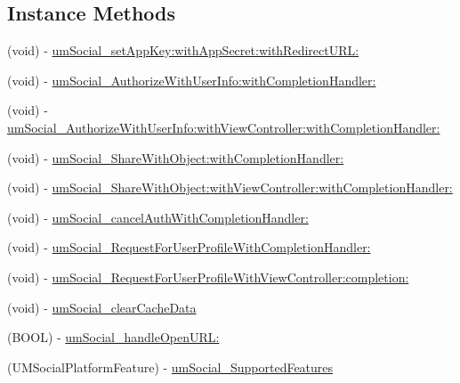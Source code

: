 \subsection*{Instance Methods}
\begin{DoxyCompactItemize}
\item 
(void) -\/ \mbox{\hyperlink{protocol_u_m_social_platform_provider_01-p_a4591a33b9f6de5ff2a688fbb82e42d6b}{um\+Social\+\_\+set\+App\+Key\+:with\+App\+Secret\+:with\+Redirect\+U\+R\+L\+:}}
\item 
(void) -\/ \mbox{\hyperlink{protocol_u_m_social_platform_provider_01-p_ae1ebabde25fa467a8dbd3360c69f1cae}{um\+Social\+\_\+\+Authorize\+With\+User\+Info\+:with\+Completion\+Handler\+:}}
\item 
(void) -\/ \mbox{\hyperlink{protocol_u_m_social_platform_provider_01-p_a99c9538562ad13c437698eadbd8fe7c6}{um\+Social\+\_\+\+Authorize\+With\+User\+Info\+:with\+View\+Controller\+:with\+Completion\+Handler\+:}}
\item 
(void) -\/ \mbox{\hyperlink{protocol_u_m_social_platform_provider_01-p_a23c57a8e07c351874d8b2bff217c3fd7}{um\+Social\+\_\+\+Share\+With\+Object\+:with\+Completion\+Handler\+:}}
\item 
(void) -\/ \mbox{\hyperlink{protocol_u_m_social_platform_provider_01-p_aaee3cd0e221b820d92575edbbf198c52}{um\+Social\+\_\+\+Share\+With\+Object\+:with\+View\+Controller\+:with\+Completion\+Handler\+:}}
\item 
(void) -\/ \mbox{\hyperlink{protocol_u_m_social_platform_provider_01-p_acd16d08a46fd30b401adca83262cc586}{um\+Social\+\_\+cancel\+Auth\+With\+Completion\+Handler\+:}}
\item 
(void) -\/ \mbox{\hyperlink{protocol_u_m_social_platform_provider_01-p_a1d888890a07689a660523c8e9cb614d9}{um\+Social\+\_\+\+Request\+For\+User\+Profile\+With\+Completion\+Handler\+:}}
\item 
(void) -\/ \mbox{\hyperlink{protocol_u_m_social_platform_provider_01-p_a19f829db2b2d3c83f332556b3685e411}{um\+Social\+\_\+\+Request\+For\+User\+Profile\+With\+View\+Controller\+:completion\+:}}
\item 
(void) -\/ \mbox{\hyperlink{protocol_u_m_social_platform_provider_01-p_a0ed5acc40aa41283f7e5fb5a1ef7faa8}{um\+Social\+\_\+clear\+Cache\+Data}}
\item 
(B\+O\+OL) -\/ \mbox{\hyperlink{protocol_u_m_social_platform_provider_01-p_a5076903efac29b14aa957259fa554bd2}{um\+Social\+\_\+handle\+Open\+U\+R\+L\+:}}
\item 
(U\+M\+Social\+Platform\+Feature) -\/ \mbox{\hyperlink{protocol_u_m_social_platform_provider_01-p_a76d1a85244d9f7d3407197fa8fcee200}{um\+Social\+\_\+\+Supported\+Features}}

\end{DoxyCompactItemize}
